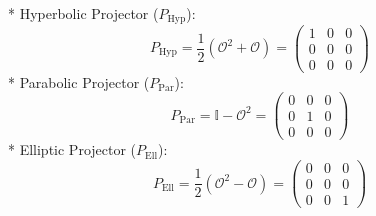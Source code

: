 * Hyperbolic Projector ($P_{\text{Hyp}}$):
$$P_{\text{Hyp}} = \frac{1}{2}(\mathcal{O}^2 + \mathcal{O}) = \begin{pmatrix} 1 & 0 & 0 \\ 0 & 0 & 0 \\ 0 & 0 & 0 \end{pmatrix}$$ 
* Parabolic Projector ($P_{\text{Par}}$):
$$P_{\text{Par}} = \mathbb{I} - \mathcal{O}^2 = \begin{pmatrix} 0 & 0 & 0 \\ 0 & 1 & 0 \\ 0 & 0 & 0 \end{pmatrix}$$ 
* Elliptic Projector ($P_{\text{Ell}}$):
$$P_{\text{Ell}} = \frac{1}{2}(\mathcal{O}^2 - \mathcal{O}) = \begin{pmatrix} 0 & 0 & 0 \\ 0 & 0 & 0 \\ 0 & 0 & 1 \end{pmatrix}$$ 

